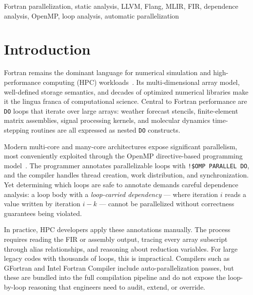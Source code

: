 \documentclass[conference]{IEEEtran}
\begin{document}
\begin{IEEEkeywords}
Fortran parallelization, static analysis, LLVM, Flang, MLIR, FIR,
dependence analysis, OpenMP, loop analysis, automatic parallelization
\end{IEEEkeywords}

\section{Introduction}
\label{sec:intro}

Fortran remains the dominant language for numerical simulation and
high-performance computing (HPC) workloads~\cite{metcalf2011modern}.
Its multi-dimensional array model, well-defined storage semantics, and
decades of optimized numerical libraries make it the lingua franca of
computational science.  Central to Fortran performance are
\texttt{DO} loops that iterate over large arrays: weather forecast
stencils, finite-element matrix assemblies, signal processing kernels,
and molecular dynamics time-stepping routines are all expressed as
nested \texttt{DO} constructs.

Modern multi-core and many-core architectures expose significant
parallelism, most conveniently exploited through the OpenMP
directive-based programming model~\cite{openmp51}.  The programmer
annotates parallelizable loops with \texttt{!\$OMP PARALLEL DO}, and
the compiler handles thread creation, work distribution, and
synchronization.  Yet determining which loops are safe to annotate
demands careful dependence analysis: a loop body with a
\emph{loop-carried dependency} — where iteration $i$ reads a value
written by iteration $i-k$ — cannot be parallelized without
correctness guarantees being violated.

In practice, HPC developers apply these annotations manually.  The
process requires reading the FIR or assembly output, tracing every
array subscript through alias relationships, and reasoning about
reduction variables.  For large legacy codes with thousands of loops,
this is impractical.  Compilers such as GFortran and Intel Fortran
Compiler include auto-parallelization passes, but these are bundled
into the full compilation pipeline and do not expose the
loop-by-loop reasoning that engineers need to audit, extend, or
override.
\end{document}
